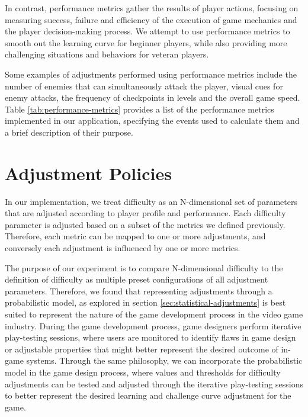 
In contrast, performance metrics gather the results of player actions, focusing on measuring success, failure and efficiency of the execution of game mechanics and the player decision-making process. We attempt to use performance metrics to smooth out the learning curve for beginner players, while also providing more challenging situations and behaviors for veteran players.

Some examples of adjustments performed using performance metrics include the number of enemies that can simultaneously attack the player, visual cues for enemy attacks, the frequency of checkpoints in levels and the overall game speed. Table \ref{tab:performance-metrics} provides a list of the performance metrics implemented in our application, specifying the events used to calculate them and a brief description of their purpose.




\section{Adjustment Policies}
\label{sec:adjustments}

In our implementation, we treat difficulty as an N-dimensional set of parameters that are adjusted according to player profile and performance. Each difficulty parameter is adjusted based on a subset of the metrics we defined previously. Therefore, each metric can be mapped to one or more adjustments, and conversely each adjustment is influenced by one or more metrics.

The purpose of our experiment is to compare N-dimensional difficulty to the definition of difficulty as multiple preset configurations of all adjustment parameters. Therefore, we found that representing adjustments through a probabilistic model, as explored in section \ref{sec:statistical-adjustments} is best suited to represent the nature of the game development process in the video game industry. During the game development process, game designers perform iterative play-testing sessions, where users are monitored to identify flaws in game design or adjustable properties that might better represent the desired outcome of in-game systems. Through the same philosophy, we can incorporate the probabilistic model in the game design process, where values and thresholds for difficulty adjustments can be tested and adjusted through the iterative play-testing sessions to better represent the desired learning and challenge curve adjustment for the game.

